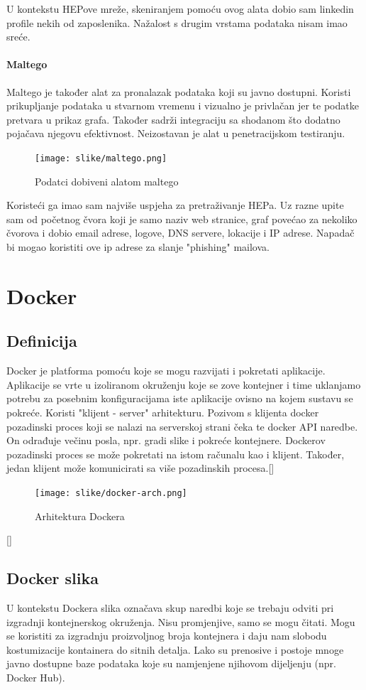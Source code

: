 \documentclass[times, utf8, zavrsni]{fer}
\begin{document}
U kontekstu HEPove mreže, skeniranjem pomoću ovog alata dobio sam linkedin profile nekih od zaposlenika. Nažalost s drugim vrstama podataka nisam imao sreće.

\subsubsection{Maltego}
Maltego je također alat za pronalazak podataka koji su javno dostupni. Koristi prikupljanje podataka u stvarnom vremenu i vizualno je privlačan jer te podatke pretvara u prikaz grafa. Također sadrži integraciju sa shodanom što dodatno pojačava njegovu efektivnost. Neizostavan je alat u penetracijskom testiranju.

\begin{figure}[htb]
\centering
\texttt{[image: slike/maltego.png]}
\caption{Podatci dobiveni alatom maltego}
\label{fig:maltego}
\end{figure}

Koristeći ga imao sam najviše uspjeha za pretraživanje HEPa. Uz razne upite sam od početnog čvora koji je samo naziv web stranice, graf povećao za nekoliko čvorova i dobio email adrese, logove, DNS servere, lokacije i IP adrese. Napadač bi mogao koristiti ove ip adrese za slanje "phishing" mailova. 

\chapter{Docker}
\section{Definicija}
Docker je platforma pomoću koje se mogu razvijati i pokretati aplikacije. Aplikacije se vrte u izoliranom okruženju koje se zove kontejner i time uklanjamo potrebu za posebnim konfiguracijama iste aplikacije ovisno na kojem sustavu se pokreće. Koristi "klijent - server" arhitekturu. Pozivom s klijenta docker pozadinski proces koji se nalazi na serverskoj strani čeka te docker API naredbe. On odrađuje večinu posla, npr. gradi slike i pokreće kontejnere. Dockerov pozadinski proces se može pokretati na istom računalu kao i klijent. Također, jedan klijent može komunicirati sa više pozadinskih procesa.[\cite{docker}]
\begin{figure}[htb]
\centering
\texttt{[image: slike/docker-arch.png]}
\caption{Arhitektura Dockera}
\label{fig:docker-arch}
\end{figure}[\cite{docker}]

\section{Docker slika}
U kontekstu Dockera slika označava skup naredbi koje se trebaju odviti pri izgradnji kontejnerskog okruženja. Nisu promjenjive, samo se mogu čitati. Mogu se koristiti za izgradnju proizvoljnog broja kontejnera i daju nam slobodu kostumizacije kontainera do sitnih detalja. Lako su prenosive i postoje mnoge javno dostupne baze podataka koje su namjenjene njihovom dijeljenju (npr. Docker Hub).
\end{document}

